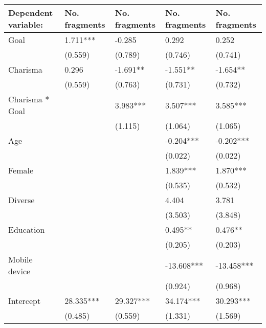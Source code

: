 \begin{tabular}{lllll}
\toprule
Dependent variable: & No. fragments & No. fragments & No. fragments & No. fragments \\
\midrule
Goal                          &      1.711*** &        -0.285 &         0.292 &         0.252 \\
                              &       (0.559) &       (0.789) &       (0.746) &       (0.741) \\
Charisma                      &         0.296 &      -1.691** &      -1.551** &      -1.654** \\
                              &       (0.559) &       (0.763) &       (0.731) &       (0.732) \\
Charisma * Goal               &               &      3.983*** &      3.507*** &      3.585*** \\
                              &               &       (1.115) &       (1.064) &       (1.065) \\
Age                           &               &               &     -0.204*** &     -0.202*** \\
                              &               &               &       (0.022) &       (0.022) \\
Female                        &               &               &      1.839*** &      1.870*** \\
                              &               &               &       (0.535) &       (0.532) \\
Diverse                       &               &               &         4.404 &         3.781 \\
                              &               &               &       (3.503) &       (3.848) \\
Education                     &               &               &       0.495** &       0.476** \\
                              &               &               &       (0.205) &       (0.203) \\
Mobile device                 &               &               &    -13.608*** &    -13.458*** \\
                              &               &               &       (0.924) &       (0.968) \\
Intercept                     &     28.335*** &     29.327*** &     34.174*** &     30.293*** \\
                              &       (0.485) &       (0.559) &       (1.331) &       (1.569) \\

\end{tabular}
